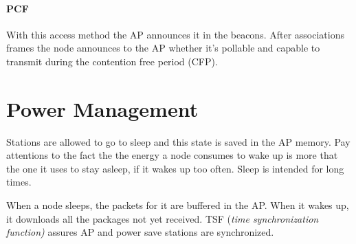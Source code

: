 \paragraph*{PCF} With this access method the AP announces it in the beacons.
After associations frames the node announces to the AP whether it's pollable
and capable to transmit during the contention free period (CFP).

\section{Power Management}
Stations are allowed to go to sleep and this state is saved in the AP memory.
Pay attentions to the fact the the energy a node consumes to wake up is more
that the one it uses to stay asleep, if it wakes up too often. Sleep is intended
for long times.

When a node sleeps, the packets for it are buffered in the AP. When it wakes up,
it downloads all the packages not yet received. TSF (\textit{time
  synchronization function)} assures AP and power save stations are
synchronized.
